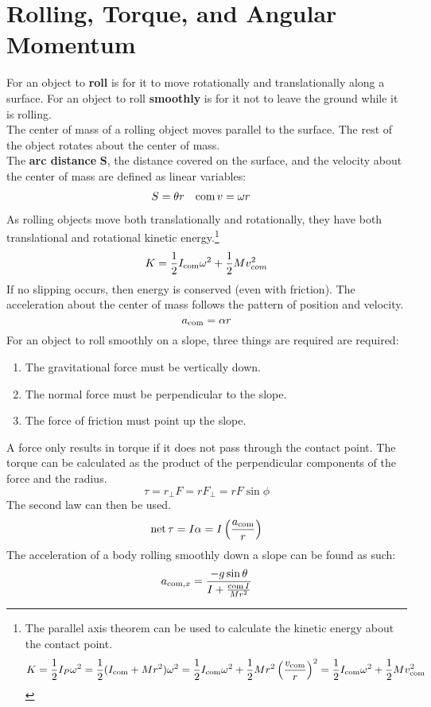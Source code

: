 \documentclass[../AP_Physics_C.tex]{subfiles}
\begin{document}
	\section{Rolling, Torque, and Angular Momentum}
		For an object to \textbf{roll} is for it to move rotationally and translationally along a surface. For an object to roll \textbf{smoothly} is for it not to leave the ground while it is rolling. \\
		The center of mass of a rolling object moves parallel to the surface. The rest of the object rotates about the center of mass. \\
		The \textbf{arc distance} $\pmb{S}$, the distance covered on the surface, and the velocity about the center of mass are defined as linear variables:
		\begin{align*}
			S &= \theta r & \operatorname{com}{v} &= \omega r
		\end{align*}
		As rolling objects move both translationally and rotationally, they have both translational and rotational kinetic energy.\footnote{
			The parallel axis theorem can be used to calculate the kinetic energy about the contact point.
			\[
				K = \frac{1}{2}I_P\omega^2 = \frac{1}{2}(I_{\operatorname{com}} + Mr^2)\omega^2 = \frac{1}{2}I_{\operatorname{com}}\omega^2 + \frac{1}{2}Mr^2\left(\frac{v_{\operatorname{com}}}{r}\right)^2 = \frac{1}{2}I_{\operatorname{com}}\omega^2 + \frac{1}{2}Mv_{\operatorname{com}}^2		
			\]
			}
		\[K = \frac{1}{2}I_{\operatorname{com}}\omega^2 + \frac{1}{2}Mv_{com}^2\]
		If no slipping occurs, then energy is conserved (even with friction).
		The acceleration about the center of mass follows the pattern of position and velocity.
		\[a_{\operatorname{com}} = \alpha r\]
		For an object to roll smoothly on a slope, three things are required are required:
		\begin{enumerate}
			\item
				The gravitational force must be vertically down.
			\item
				The normal force must be perpendicular to the slope.
			\item
				The force of friction must point up the slope.
		\end{enumerate}
		A force only results in torque if it does not pass through the contact point. The torque can be calculated as the product of the perpendicular components of the force and the radius.
		\[\tau = r_\bot F = rF_\bot = rF\sin\phi\]
		The second law can then be used.
		\[\operatorname{net}{\tau} = I\alpha = I\left(\frac{a_{\operatorname{com}}}{r}\right)\]
		The acceleration of a body rolling smoothly down a slope can be found as such:
		\[a_{\operatorname{com}, x} = \frac{-g\sin\theta}{I + \frac{\operatorname{com}{I}}{Mr^2}}\]
\end{document}
